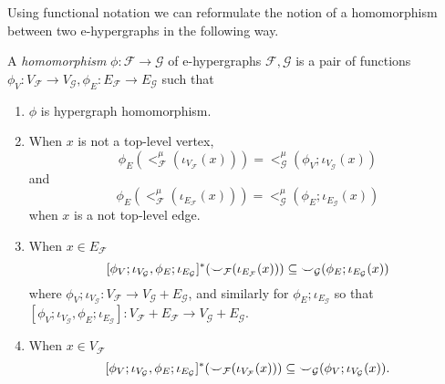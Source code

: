 \begin{remark}
    Using functional notation we can reformulate the notion of a homomorphism between two e-hypergraphs in the following way.
\end{remark}
\begin{definition}
        \label{def:e-homo-2}    
        A \emph{homomorphism} $\phi: \mathcal{F} \to \mathcal{G}$ of e-hypergraphs $\mathcal{F},\mathcal{G}$ is a pair of functions $\phi_V : V_{\mathcal{F}} \to V_{\mathcal{G}}, \phi_E : E_{\mathcal{F}} \to E_{\mathcal{G}}$ such that
        
        \begin{enumerate}
            \item $\phi$ is hypergraph homomorphism.
            
            \item When $x$ is not a top-level vertex, 
                \[
                \phi_{E}(<_{\mathcal{F}}^{\mu}(\iota_{V_{\mathcal{F}}}(x))) = <_{\mathcal{G}}^{\mu}(\phi_{V};\iota_{V_{\mathcal{G}}}(x))
                \]
                and
                \[
                \phi_{E}(<_{\mathcal{F}}^{\mu}(\iota_{E_{\mathcal{F}}}(x))) = <_{\mathcal{G}}^{\mu}(\phi_{E};\iota_{E_{\mathcal{G}}}(x))  
                \] when $x$ is a not top-level edge.
                \item
            When $x \in E_{\mathcal{F}}$
            \[
                [\phi_{V};\iota_{V_{\mathcal{G}}}, \phi_{E};\iota_{E_{\mathcal{G}}} ]^{*}({\smile}_{\mathcal{F}}(\iota_{E_{\mathcal{F}}}(x)))
                \subseteq
                {\smile}_{\mathcal{G}}(\phi_{E};\iota_{E_{\mathcal{G}}}(x))
            \]
            where $\phi_{V};\iota_{V_{\mathcal{G}}} : V_{\mathcal{F}} \to V_{\mathcal{G}} + E_{\mathcal{G}}$, and similarly for $\phi_{E};\iota_{E_\mathcal{G}}$ so that $[\phi_{V};\iota_{V_{\mathcal{G}}}, \phi_{E};\iota_{E_{\mathcal{G}}}] : V_{\mathcal{F}} + E_{\mathcal{F}} \to  V_{\mathcal{G}} + E_{\mathcal{G}}$.
            \item When $x \in V_{\mathcal{F}}$
            \[
                [\phi_{V};\iota_{V_{\mathcal{G}}}, \phi_{E};\iota_{E_{\mathcal{G}}}]^{*}({\smile}_{\mathcal{F}}(\iota_{V_{\mathcal{F}}}(x)))
                \subseteq
                {\smile}_{\mathcal{G}}(\phi_{V};\iota_{V_{\mathcal{G}}}(x)).
            \]
            \end{enumerate}
\end{definition}

